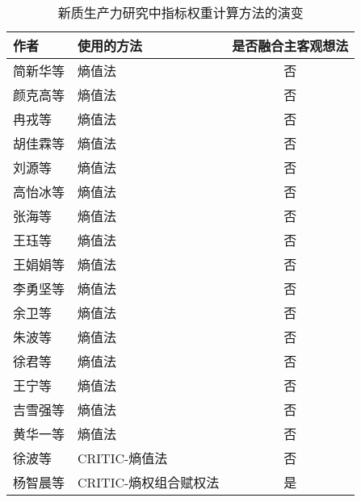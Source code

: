 \documentclass[nonblindrev]{write_paper}
\begin{document}
\begin{table}[htbp]
  \centering
  \caption{新质生产力研究中指标权重计算方法的演变}
  \label{tab:weight_methods}
  \begin{tabular}{lp{6cm}c}
    \toprule
    作者 & 使用的方法 & 是否融合主客观想法 \\
    \midrule
    简新华等\citep{简新华2024中国新质生产力水平测度及省际现状的比较分析} & 熵值法 & 否 \\
    颜克高等\citep{颜克高2025中国新质生产力发展的水平测度与区域差异研究} & 熵值法 & 否 \\
    冉戎等\citep{冉戎2024新质生产力发展潜力测度、时空差异及战略着力点研究} & 熵值法 & 否 \\
    胡佳霖等\citep{胡佳霖2024中国新质生产力：区域差距、动态演进与跃迁趋势} & 熵值法 & 否 \\
    刘源等\citep{刘源2025新质生产力发展水平动态演进、影响因素及提升路径} & 熵值法 & 否 \\
    高怡冰等\citep{高怡冰2024中国新质生产力的发展水平和演进趋势} & 熵值法 & 否 \\
    张海等\citep{张海2024新质生产力发展水平、空间差异及动态演进} & 熵值法 & 否 \\
    王珏等\citep{王珏2024新质生产力：指标构建与时空演进} & 熵值法 & 否 \\
    王娟娟等\citep{王娟娟2024新质生产力对产业布局的影响与区域锁定} & 熵值法 & 否 \\
    李勇坚等\citep{李勇坚2025新质生产力的科学内涵、要素基础与测度研究} & 熵值法 & 否 \\
    余卫等\citep{余卫2024数字经济赋能新质生产力发展的内在机理与提升路径研究} & 熵值法 & 否 \\
    朱波等\citep{朱波2024数字金融发展对区域新质生产力的影响及作用机制} & 熵值法 & 否 \\
    徐君等\citep{徐君2025新型工业化与新质生产力耦合协调度} & 熵值法 & 否 \\
    王宁等\citep{王宁2024新质生产力发展水平测度、动态演进与时空收敛特征} & 熵值法 & 否 \\
    吉雪强等\citep{吉雪强2025中国新质生产力空间关联网络结构时空演化特征及驱动因素} & 熵值法 & 否 \\
    黄华一等\citep{黄华一2025新质生产力的统计测度与区域差异分析} & 熵值法 & 否 \\
    徐波等\citep{徐波2024新质生产力对资源配置效率的影响效应研究} & CRITIC-熵值法 & 否 \\
    杨智晨等\citep{杨智晨2025我国新质生产力发展的理论基础、时空特征及分异机理} & CRITIC-熵权组合赋权法 & 是 \\

\end{tabular}
\end{table}
\end{document}
